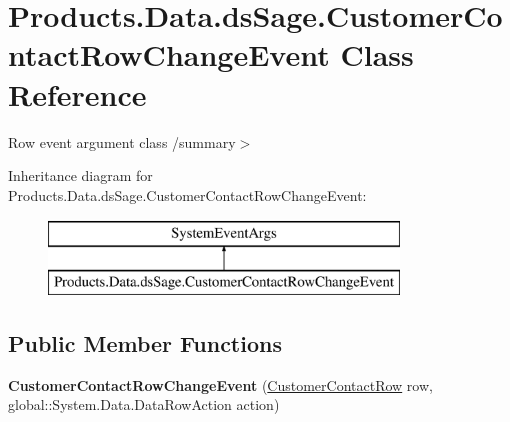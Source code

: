 \hypertarget{class_products_1_1_data_1_1ds_sage_1_1_customer_contact_row_change_event}{}\section{Products.\+Data.\+ds\+Sage.\+Customer\+Contact\+Row\+Change\+Event Class Reference}
\label{class_products_1_1_data_1_1ds_sage_1_1_customer_contact_row_change_event}


Row event argument class /summary$>$  


Inheritance diagram for Products.\+Data.\+ds\+Sage.\+Customer\+Contact\+Row\+Change\+Event\+:\begin{figure}[H]
\begin{center}
\leavevmode
\includegraphics[height=2.000000cm]{class_products_1_1_data_1_1ds_sage_1_1_customer_contact_row_change_event}
\end{center}
\end{figure}
\subsection*{Public Member Functions}
\begin{DoxyCompactItemize}
\item 
{\bfseries Customer\+Contact\+Row\+Change\+Event} (\hyperlink{class_products_1_1_data_1_1ds_sage_1_1_customer_contact_row}{Customer\+Contact\+Row} row, global\+::\+System.\+Data.\+Data\+Row\+Action action)\hypertarget{class_products_1_1_data_1_1ds_sage_1_1_customer_contact_row_change_event_a1c99d1f49ee36336081b1b852455daf7}{}\label{class_products_1_1_data_1_1ds_sage_1_1_customer_contact_row_change_event_a1c99d1f49ee36336081b1b852455daf7}

\end{DoxyCompactItemize}
